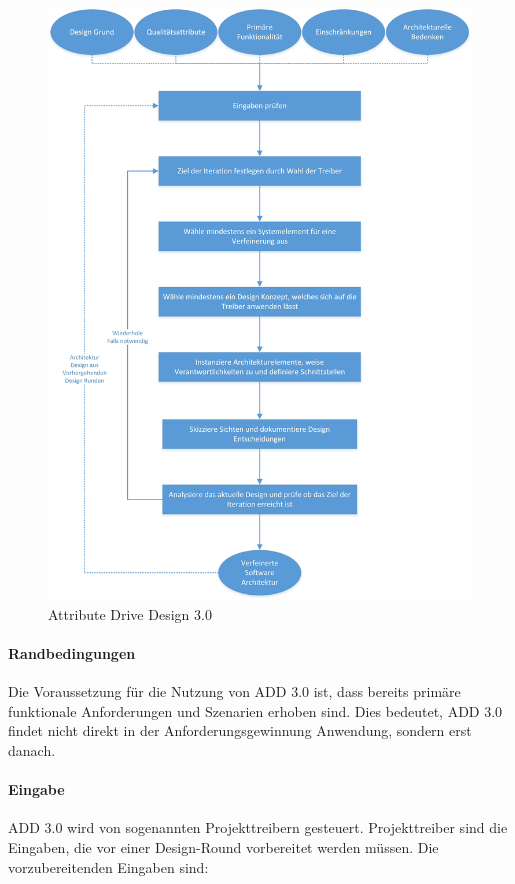 \begin{figure}[h]
	\centering
	\includegraphics[scale=0.45]{add3.jpg} 
	\caption{Attribute Drive Design 3.0}\label{fig_add3}
\end{figure}

\paragraph{Randbedingungen}
Die Voraussetzung f\"ur die Nutzung von ADD 3.0 ist, dass bereits prim\"are funktionale Anforderungen und Szenarien erhoben sind. Dies bedeutet, ADD 3.0 findet nicht direkt in der Anforderungsgewinnung Anwendung, sondern erst danach. \\

\paragraph{Eingabe}
ADD 3.0 wird von sogenannten Projekttreibern gesteuert. Projekttreiber sind die Eingaben, die vor einer Design-Round vorbereitet werden m\"ussen. Die vorzubereitenden Eingaben sind:\\

